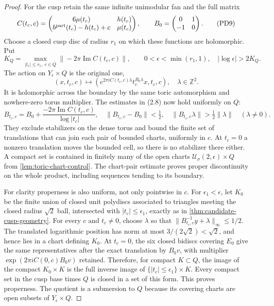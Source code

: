\begin{proof}
For the cusp retain the same infinite unimodular fan and the full matrix
\[
 C(t_c,c)=
 \begin{pmatrix}6\mu(t_c)&h(t_c)\\
 b^{\rm part}(t_c)-h(t_c)+c&\mu(t_c)
 \end{pmatrix},\qquad
 B_0=\begin{pmatrix}0&1\\-1&0\end{pmatrix}.
 \tag{PD9}
\]
Choose a closed cusp disc of radius $r_1$ on which these functions are
holomorphic. Put
\[
 K_Q=\max_{|t_c|\le r_1,\ c\in\overline Q}
          \|-2\pi\operatorname{Im}C(t_c,c)\|,
 \qquad 0<\epsilon<\min(r_1,1),\quad
          |\log\epsilon|>2K_Q.
 \tag{PD10}
\]
The action on $Y_\epsilon\times Q$ is the original one,
\[
 (x,t_c,c)\longmapsto
 \left(e^{2\pi iC(t_c,c)\lambda}
                  t_c^{B_0\lambda}x,t_c,c\right),
 \quad\lambda\in\mathbb Z^2.
 \tag{PD11}
\]
It is holomorphic across the boundary by the same toric automorphism
and nowhere-zero torus multiplier. The estimates in (2.8) now hold
uniformly on $Q$:
\[
 B_{t_c,c}=B_0+
       \frac{-2\pi\operatorname{Im}C(t_c,c)}{\log|t_c|},\quad
 \|B_{t_c,c}-B_0\|<\tfrac12,\quad
 \|B_{t_c,c}\lambda\|>\tfrac12\|\lambda\|\quad(\lambda\ne0).
 \tag{PD12}
\]
They exclude stabilizers on the dense torus and bound the finite set
of translations that can join each pair of bounded charts, uniformly
in $c$. At $t_c=0$ a nonzero translation moves the bounded cell, so
there is no stabilizer there either. A compact set is contained in finitely
many of the open charts $\mathcal U_\sigma(2,\epsilon)\times Q$ from
\cref{lem:toric-chart-control}.
The chart-pair estimate proves proper discontinuity on the whole
product, including sequences tending to its boundary.

For clarity properness is also uniform, not only pointwise in $c$.
For $\epsilon_1<\epsilon$, let $K_0$ be the finite union of closed
unit polydiscs associated to triangles meeting the closed radius
$\sqrt2$ ball, intersected with $|t_c|\le\epsilon_1$, exactly as in
\cref{thm:candidate-cusp-geometry}. For every $c$ and $t_c\ne0$,
choose $\lambda$ so that
$\|B_{t_c,c}^{-1}y+\lambda\|_\infty\le1/2$.
The translated logarithmic position has norm at most
$3/(2\sqrt2)<\sqrt2$, and hence lies in a chart defining $K_0$.
At $t_c=0$, the six closed bidiscs covering $E_0$ give the same
representatives after the exact translation by $B_0v$, with multiplier
$\exp(2\pi iC(0,c)B_0v)$ retained. Therefore, for compact $K\subset Q$,
the image of the compact $K_0\times K$ is the full inverse image of
$\{|t_c|\le\epsilon_1\}\times K$. Every compact set in the cusp
base times $Q$ is closed in a set of this form. This proves properness.
The quotient is a submersion to $Q$ because its covering charts are
open subsets of $Y_\epsilon\times Q$.


\end{proof}
